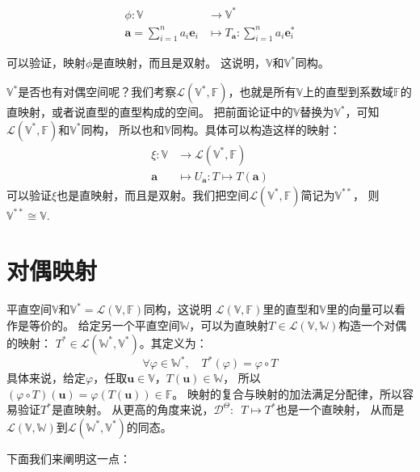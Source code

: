 \documentclass[12pt,UTF8,fontset=none]{ctexbook}
\begin{document}
\begin{align*} 
    \phi : \mathbb{V} &\rightarrow \mathbb{V}^*  \\
    \mathbf{a} = \sum_{i=1}^n a_i \mathbf{e}_i &\mapsto  T_{\mathbf{a}} : \sum_{i=1}^n a_i \mathbf{e}_i^* 
\end{align*}

可以验证，映射$\phi$是直映射，而且是双射。
这说明，$\mathbb{V}$和$\mathbb{V}^*$同构。

$\mathbb{V}^*$是否也有对偶空间呢？我们考察$\mathcal{L}(\mathbb{V}^*, \mathbb{F})$，也就是所有$\mathbb{V}$上的直型到系数域$\mathbb{F}$的直映射，或者说直型的直型构成的空间。
把前面论证中的$\mathbb{V}$替换为$\mathbb{V}^*$，可知$\mathcal{L}(\mathbb{V}^*, \mathbb{F})$和$\mathbb{V}^*$同构，
所以也和$\mathbb{V}$同构。具体可以构造这样的映射：
\begin{align*} 
    \xi : \mathbb{V} &\rightarrow \mathcal{L}(\mathbb{V}^*, \mathbb{F}) \\
    \mathbf{a}  &\mapsto  U_{\mathbf{a}} : T\mapsto T({\mathbf{a}}) 
\end{align*}
可以验证$\xi$也是直映射，而且是双射。我们把空间$\mathcal{L}(\mathbb{V}^*, \mathbb{F})$简记为$\mathbb{V}^{**}$，
则$\mathbb{V}^{**}\cong\mathbb{V}.$

\section{对偶映射}

平直空间$\mathbb{V}$和$\mathbb{V}^* = \mathcal{L}(\mathbb{V}, \mathbb{F})$同构，这说明
$\mathcal{L}(\mathbb{V}, \mathbb{F})$里的直型和$\mathbb{V}$里的向量可以看作是等价的。
给定另一个平直空间$ \mathbb{W}$，可以为直映射$T \in \mathcal{L}(\mathbb{V}, \mathbb{W})$构造一个对偶的映射：
$T^* \in \mathcal{L}(\mathbb{W}^*, \mathbb{V}^*)$。其定义为：
$$ \forall \varphi \in \mathbb{W}^*, \quad T^*(\varphi) = \varphi \circ T $$
具体来说，给定$\varphi$，任取$\mathbf{u} \in \mathbb{V}$，$T(\mathbf{u}) \in \mathbb{W}$，
所以$(\varphi \circ T)(\mathbf{u}) = \varphi(T(\mathbf{u}))\in \mathbb{F}$。
映射的复合与映射的加法满足分配律，所以容易验证$T^*$是直映射。
从更高的角度来说，$\mathcal{D}^{\Theta}:\,\,\, T \mapsto T^*$也是一个直映射，
从而是$\mathcal{L}(\mathbb{V}, \mathbb{W})$到$\mathcal{L}(\mathbb{W}^*, \mathbb{V}^*)$的同态。

下面我们来阐明这一点：
\end{document}
